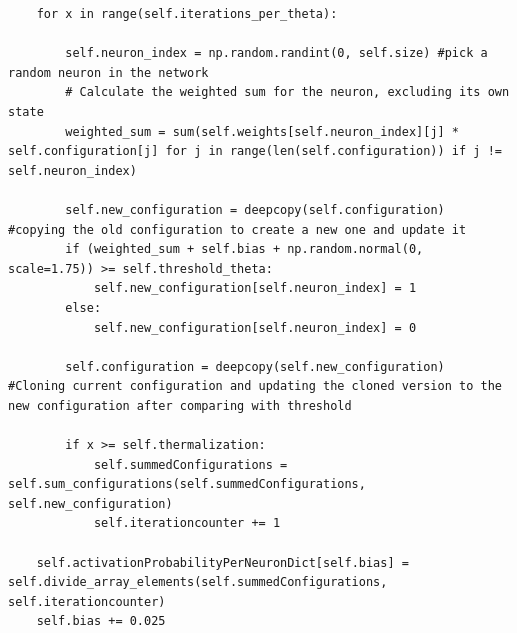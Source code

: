 \begin{lstlisting}
    for x in range(self.iterations_per_theta):
                    
        self.neuron_index = np.random.randint(0, self.size) #pick a random neuron in the network
        # Calculate the weighted sum for the neuron, excluding its own state
        weighted_sum = sum(self.weights[self.neuron_index][j] * self.configuration[j] for j in range(len(self.configuration)) if j != self.neuron_index)

        self.new_configuration = deepcopy(self.configuration)   #copying the old configuration to create a new one and update it
        if (weighted_sum + self.bias + np.random.normal(0, scale=1.75)) >= self.threshold_theta:          
            self.new_configuration[self.neuron_index] = 1
        else:
            self.new_configuration[self.neuron_index] = 0
            
        self.configuration = deepcopy(self.new_configuration)   #Cloning current configuration and updating the cloned version to the new configuration after comparing with threshold

        if x >= self.thermalization:  
            self.summedConfigurations = self.sum_configurations(self.summedConfigurations, self.new_configuration)    
            self.iterationcounter += 1
        
    self.activationProbabilityPerNeuronDict[self.bias] = self.divide_array_elements(self.summedConfigurations, self.iterationcounter)
    self.bias += 0.025
\end{lstlisting}

